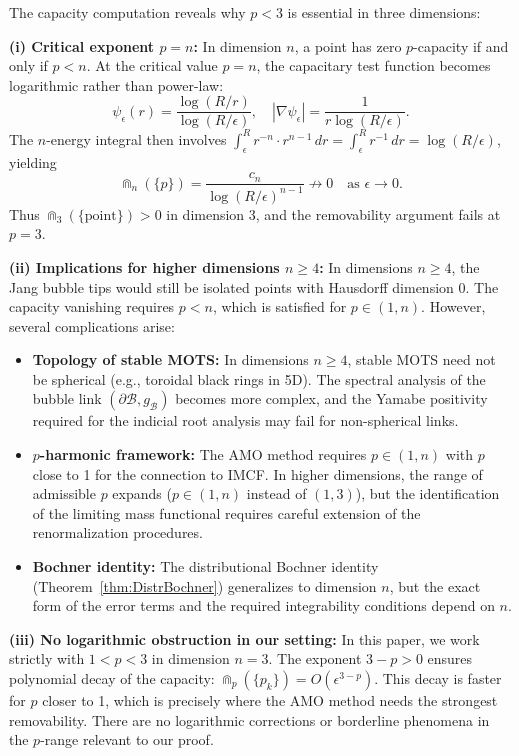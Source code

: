 \begin{remark}[Logarithmic Divergence at $p = 3$ and Higher Dimensions]\label{rmk:CriticalCapacity}
The capacity computation reveals why $p < 3$ is essential in three dimensions:

\textbf{(i) Critical exponent $p = n$:} In dimension $n$, a point has zero $p$-capacity if and only if $p < n$. At the critical value $p = n$, the capacitary test function becomes logarithmic rather than power-law:
\[
    \psi_\epsilon(r) = \frac{\log(R/r)}{\log(R/\epsilon)}, \quad |\nabla \psi_\epsilon| = \frac{1}{r \log(R/\epsilon)}.
\]
The $n$-energy integral then involves $\int_\epsilon^R r^{-n} \cdot r^{n-1} \, dr = \int_\epsilon^R r^{-1} \, dr = \log(R/\epsilon)$, yielding
\[
    \Cap_n(\{p\}) = \frac{c_n}{\log(R/\epsilon)^{n-1}} \not\to 0 \quad \text{as } \epsilon \to 0.
\]
Thus $\Cap_3(\{\text{point}\}) > 0$ in dimension 3, and the removability argument fails at $p = 3$.

\textbf{(ii) Implications for higher dimensions $n \ge 4$:} In dimensions $n \ge 4$, the Jang bubble tips would still be isolated points with Hausdorff dimension 0. The capacity vanishing requires $p < n$, which is satisfied for $p \in (1, n)$. However, several complications arise:
\begin{itemize}
    \item \textbf{Topology of stable MOTS:} In dimensions $n \ge 4$, stable MOTS need not be spherical (e.g., toroidal black rings in 5D). The spectral analysis of the bubble link $(\partial \mathcal{B}, g_{\mathcal{B}})$ becomes more complex, and the Yamabe positivity required for the indicial root analysis may fail for non-spherical links.
    
    \item \textbf{$p$-harmonic framework:} The AMO method requires $p \in (1, n)$ with $p$ close to 1 for the connection to IMCF. In higher dimensions, the range of admissible $p$ expands ($p \in (1, n)$ instead of $(1, 3)$), but the identification of the limiting mass functional requires careful extension of the renormalization procedures.
    
    \item \textbf{Bochner identity:} The distributional Bochner identity (Theorem~\ref{thm:DistrBochner}) generalizes to dimension $n$, but the exact form of the error terms and the required integrability conditions depend on $n$.
\end{itemize}

\textbf{(iii) No logarithmic obstruction in our setting:} In this paper, we work strictly with $1 < p < 3$ in dimension $n = 3$. The exponent $3 - p > 0$ ensures polynomial decay of the capacity: $\Cap_p(\{p_k\}) = O(\epsilon^{3-p})$. This decay is faster for $p$ closer to 1, which is precisely where the AMO method needs the strongest removability. There are no logarithmic corrections or borderline phenomena in the $p$-range relevant to our proof.


\end{remark}
